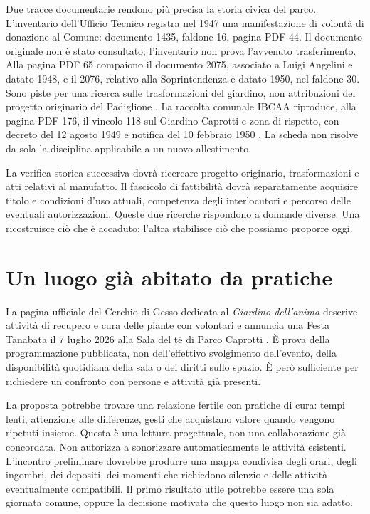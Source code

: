 Due tracce documentarie rendono più precisa la storia civica del parco.
L'inventario dell'Ufficio Tecnico registra nel 1947 una manifestazione di
volontà di donazione al Comune: documento 1435, faldone 16, pagina PDF 44.
Il documento originale non è stato consultato; l'inventario non prova
l'avvenuto trasferimento. Alla pagina PDF 65 compaiono il documento 2075,
associato a Luigi Angelini e datato 1948, e il 2076, relativo alla
Soprintendenza e datato 1950, nel faldone 30. Sono piste per una ricerca
sulle trasformazioni del giardino, non attribuzioni del progetto originario
del Padiglione \cite{mai_inventario}. La raccolta comunale IBCAA riproduce,
alla pagina PDF 176, il vincolo 118 sul Giardino Caprotti e zona di rispetto,
con decreto del 12 agosto 1949 e notifica del 10 febbraio 1950
\cite{bergamo_vincolo118}. La scheda non risolve da sola la disciplina applicabile
a un nuovo allestimento.

La verifica storica successiva dovrà ricercare progetto originario,
trasformazioni e atti relativi al manufatto. Il fascicolo di fattibilità
dovrà separatamente acquisire titolo e condizioni d'uso attuali,
competenza degli interlocutori e percorso delle eventuali autorizzazioni.
Queste due ricerche rispondono a domande diverse. Una ricostruisce ciò
che è accaduto; l'altra stabilisce ciò che possiamo proporre oggi.

\section{Un luogo già abitato da pratiche}
La pagina ufficiale del Cerchio di Gesso dedicata al \emph{Giardino
dell'anima} descrive attività di recupero e cura delle piante con volontari
e annuncia una Festa Tanabata il 7 luglio 2026 alla Sala del té di Parco
Caprotti \cite{cerchio2026}. È prova della programmazione pubblicata,
non dell'effettivo svolgimento dell'evento, della disponibilità quotidiana
della sala o dei diritti sullo spazio. È però sufficiente per richiedere
un confronto con persone e attività già presenti.

La proposta potrebbe trovare una relazione fertile con pratiche di cura:
tempi lenti, attenzione alle differenze, gesti che acquistano valore quando
vengono ripetuti insieme. Questa è una lettura progettuale, non una
collaborazione già concordata. Non autorizza a sonorizzare automaticamente
le attività esistenti. L'incontro preliminare dovrebbe produrre una mappa
condivisa degli orari, degli ingombri, dei depositi, dei momenti che
richiedono silenzio e delle attività eventualmente compatibili. Il primo
risultato utile potrebbe essere una sola giornata comune, oppure la
decisione motivata che questo luogo non sia adatto.


